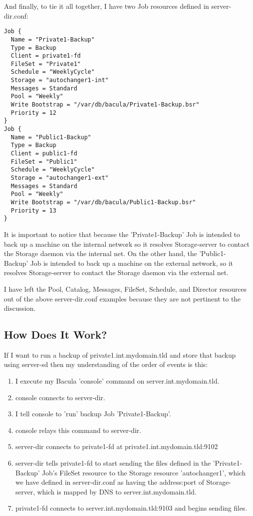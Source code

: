 And finally, to tie it all together, I have two Job resources defined in
server-dir.conf: 

\footnotesize
\begin{verbatim}
Job {
  Name = "Private1-Backup"
  Type = Backup
  Client = private1-fd
  FileSet = "Private1"
  Schedule = "WeeklyCycle"
  Storage = "autochanger1-int"
  Messages = Standard
  Pool = "Weekly"
  Write Bootstrap = "/var/db/bacula/Private1-Backup.bsr"
  Priority = 12
}
Job {
  Name = "Public1-Backup"
  Type = Backup
  Client = public1-fd
  FileSet = "Public1"
  Schedule = "WeeklyCycle"
  Storage = "autochanger1-ext"
  Messages = Standard
  Pool = "Weekly"
  Write Bootstrap = "/var/db/bacula/Public1-Backup.bsr"
  Priority = 13
}
\end{verbatim}
\normalsize

It is important to notice that because the 'Private1-Backup' Job is intended
to back up a machine on the internal network so it resolves Storage-server
to contact the Storage daemon via the internal net.
On the other hand, the 'Public1-Backup' Job is intended to
back up a machine on the external network, so it resolves Storage-server
to contact the Storage daemon via the external net.

I have left the Pool, Catalog, Messages, FileSet, Schedule, and Director
resources out of the above server-dir.conf examples because they are not
pertinent to the discussion. 

\subsection{How Does It Work?}

If I want to run a backup of private1.int.mydomain.tld and store that backup
using server-sd then my understanding of the order of events is this: 

\begin{enumerate}
\item I execute my Bacula 'console' command on server.int.mydomain.tld.  
\item console connects to server-dir.  
\item I tell console to 'run' backup Job 'Private1-Backup'.  
\item console relays this command to server-dir.  
\item server-dir connects to private1-fd at private1.int.mydomain.tld:9102  
\item server-dir tells private1-fd to start sending the files defined in  the
   'Private1-Backup' Job's FileSet resource to the Storage resource 
   'autochanger1', which we have defined in server-dir.conf as having the 
address:port of Storage-server, which is mapped by DNS to server.int.mydomain.tld.
\item private1-fd connects to server.int.mydomain.tld:9103 and begins sending 
   files. 
   \end{enumerate}

